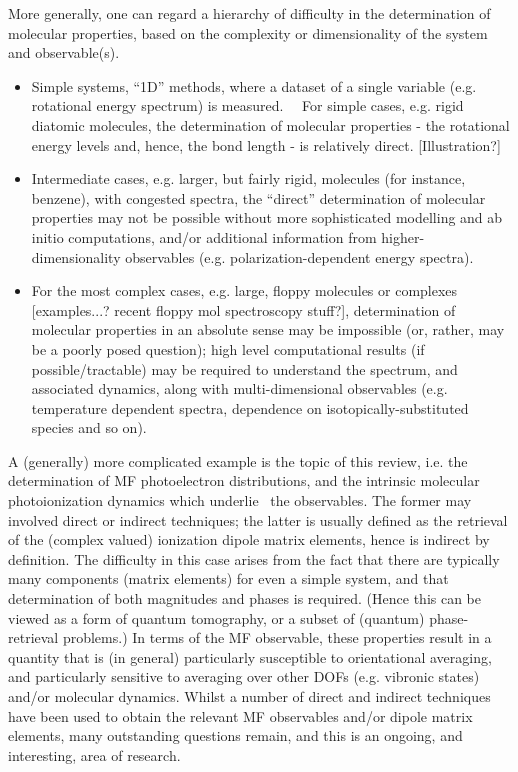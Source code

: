 More generally, one can regard a hierarchy of difficulty in the determination of molecular properties, based on the complexity or dimensionality of the system and observable(s).
\begin{itemize}
\item Simple systems, “1D” methods, where a dataset of a single variable (e.g. rotational energy spectrum) is measured.      For simple cases, e.g. rigid diatomic molecules, the determination of molecular properties - the rotational energy levels and, hence, the bond length - is relatively direct. [Illustration?]   
\item Intermediate cases, e.g. larger, but fairly rigid, molecules (for instance, benzene), with congested spectra, the “direct” determination of molecular properties may not be possible without more sophisticated modelling and ab initio computations, and/or additional information from higher-dimensionality observables (e.g. polarization-dependent energy spectra).
\item For the most complex cases, e.g. large, floppy molecules or complexes [examples...? recent floppy mol spectroscopy stuff?], determination of molecular properties in an absolute sense may be impossible (or, rather, may be a poorly posed question); high level computational results (if possible/tractable) may be required to understand the spectrum, and associated dynamics, along with multi-dimensional observables (e.g. temperature dependent spectra, dependence on isotopically-substituted species and so on).
\end{itemize}    A (generally) more complicated example is the topic of this review, i.e. the determination of MF photoelectron distributions, and the intrinsic molecular photoionization dynamics which underlie  the observables.  The former may involved direct or indirect techniques; the latter is usually defined as the retrieval of the (complex valued) ionization dipole matrix elements, hence is indirect by definition. The difficulty in this case arises from the fact that there are typically many components (matrix elements) for even a simple system, and that determination of both magnitudes and phases is required. (Hence this can be viewed as a form of quantum tomography, or a subset of (quantum) phase-retrieval problems.) In terms of the MF observable, these properties result in a quantity that is (in general) particularly susceptible to orientational averaging, and particularly sensitive to averaging over other DOFs (e.g. vibronic states) and/or molecular dynamics. Whilst a number of direct and indirect techniques have been used to obtain the relevant MF observables and/or dipole matrix elements, many outstanding questions remain, and this is an ongoing, and interesting, area of research.
